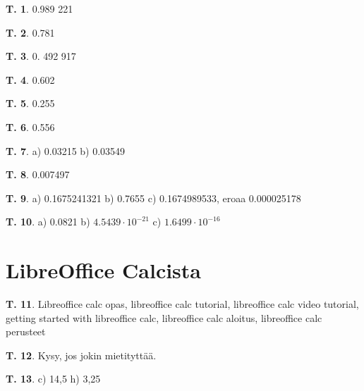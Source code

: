 \documentclass[12pt,leqno,a4paper,oneside]{amsart}
\theoremstyle{definition}
\newtheorem{exercise}{T.}
\theoremstyle{remark}
\numberwithin{equation}{section}
\begin{document}
\begin{exercise}
0.989 221
\end{exercise}

\begin{exercise}
0.781
\end{exercise}

\begin{exercise}
 0. 492 917
\end{exercise}

\begin{exercise}
0.602
\end{exercise}


\begin{exercise}
0.255
\end{exercise}


\begin{exercise}
0.556
\end{exercise}

\begin{exercise}
 a) 0.03215 b) 0.03549
\end{exercise}

\begin{exercise}
0.007497
\end{exercise}

\begin{exercise}
 a) 0.1675241321
 b) 0.7655
 c) 0.1674989533, eroaa 0.000025178
\end{exercise}

\begin{exercise}a) 0.0821 b) $4.5439\cdot 10^{-21}$ c) $1.6499\cdot 10^{-16}$  
\end{exercise}



\section{LibreOffice Calcista}

\begin{exercise}
  Libreoffice calc opas, libreoffice calc tutorial, libreoffice calc video tutorial, getting started with libreoffice calc,
  libreoffice calc aloitus, libreoffice calc perusteet
\end{exercise}

\begin{exercise}
Kysy, jos jokin mietityttää.
\end{exercise}

\begin{exercise}
 c) 14,5 
 h) 3,25
\end{exercise}
\end{document}
